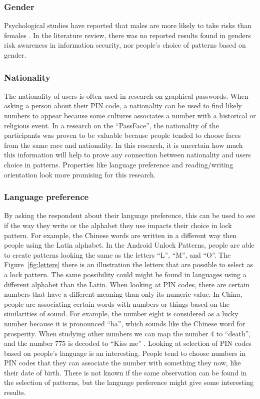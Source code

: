       \subsubsection*{Gender}
      Psychological studies have reported that males are more likely to take risks than females \cite{Byrnes}. In the literature review, there was no reported results found in genders risk awareness in information security, nor people's choice of patterns based on gender.  
      
      \subsubsection*{Nationality} 
      The nationality of users is often used in research on graphical passwords. When asking a person about their PIN code, a nationality can be used to find likely numbers to appear because some cultures associates a number with a historical or religious event. In a research on the ``PassFace'', the nationality of the participants was proven to be valuable because people tended to choose faces from the same race and nationality. In this research, it is uncertain how much this information will help to prove any connection between nationality and users choice in patterns. Properties like language preference and reading/writing orientation look more promising for this research.
      
      \subsubsection*{Language preference} 
      By asking the respondent about their language preference, this can be used to see if the way they write or the alphabet they use impacts their choice in lock pattern. For example, the Chinese words are written in a different way then people using the Latin alphabet. In the Android Unlock Patterns, people are able to create patterns looking the same as the letters ``L'', ``M'', and ``O''. The Figure~\ref{fig:letters} there is an illustration the letters that are possible to select as a lock pattern. The same possibility could might be found in languages using a different alphabet than the Latin. When looking at PIN codes, there are certain numbers that have a different meaning than only its numeric value. In China, people are associating certain words with numbers or things based on the similarities of sound. For example, the number eight is considered as a lucky number because it is pronounced ``ba'', which sounds like the Chinese word for prosperity. When studying other numbers we can map the number 4 to ``death'', and the number 775 is decoded to ``Kiss me'' \cite{ChineseChatCodes}. Looking at selection of PIN codes based on people's language is an interesting. People tend to choose numbers in PIN codes that they can associate the number with something they now, like their date of birth. There is not known if the same observation can be found in the selection of patterns, but the language preference might give some interesting results. 

